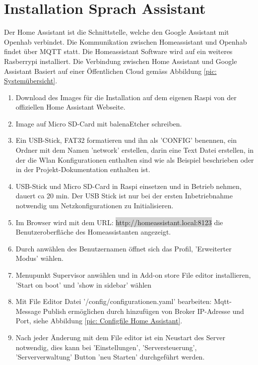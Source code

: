 \clearpage
\section{Installation Sprach Assistant} \label{sec:Assistant}
Der Home Assistant ist die Schnittstelle, welche den Google Assistant mit Openhab verbindet. Die Kommunikation zwischen Homeassistant und Openhab findet über MQTT statt. Die Homeassistant Software wird auf ein weiteres Rasberrypi installiert. Die Verbindung zwischen Home Assistant und Google Assistant Basiert auf einer Öffentlichen Cloud gemäss Abbildung \ref{pic: Systemübersicht}.

\begin{enumerate}
	\item Download des Images für die Installation auf dem eigenen Raspi von der offiziellen Home Assistant \cite{assistant_installing_nodate} Webseite.
\item Image auf Micro SD-Card mit balenaEtcher \cite{noauthor_balenaetcher_nodate} schreiben. 
\item Ein USB-Stick, FAT32 formatieren und ihn als 'CONFIG' benennen, ein Ordner mit dem Namen 'network' erstellen, darin eine Text Datei erstellen, in der die Wlan Konfigurationen enthalten sind wie als Beispiel \cite{noauthor_home-assistantoperating-system_nodate} beschrieben oder in der Projekt-Dokumentation enthalten ist.
\item USB-Stick und Micro SD-Card in Raspi einsetzen und in Betrieb nehmen, dauert ca 20 min. Der USB Stick ist nur bei der ersten Inbetriebnahme notwendig um Netzkonfigurationen zu Initialisieren.
\item Im Browser wird mit dem URL: \colorbox{lightgray}{http://homeassistant.local:8123} die Benutzeroberfläche des Homeassistanten angezeigt. 
\item Durch anwählen des Benutzernamen öffnet sich das Profil, 'Erweiterter Modus' wählen.
\item Menupunkt Supervisor anwählen und in Add-on store File editor installieren, 'Start on boot' und 'show in sidebar' wählen
\item Mit File Editor Datei '/config/configurationen.yaml' bearbeiten: Mqtt-Message Publish ermöglichen durch hinzufügen von Broker IP-Adresse und Port, siehe Abbildung \ref{pic: Configfile Home Assistant}.
\item Nach jeder Änderung mit dem File editor ist ein Neustart des Server notwendig, dies kann bei 'Einstellungen', 'Serversteuerung', 'Serververwaltung' Button 'neu Starten' durchgeführt werden.

\end{enumerate}

